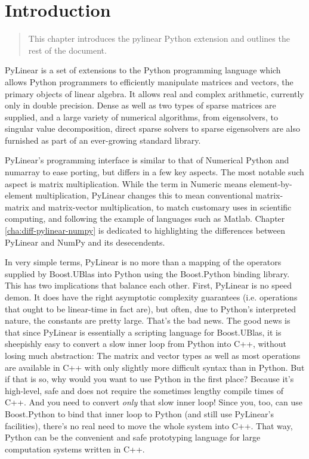 \chapter{Introduction}
\label{cha:introduction}

\begin{quote}
   This chapter introduces the pylinear Python extension and outlines the rest
   of the document.
\end{quote}

PyLinear is a set of extensions to the Python programming language
which allows Python programmers to efficiently manipulate matrices and
vectors, the primary objects of linear algebra.  It allows real and
complex arithmetic, currently only in double precision.  Dense as well
as two types of sparse matrices are supplied, and a large variety of
numerical algorithms, from eigensolvers, to singular value
decomposition, direct sparse solvers to sparse eigensolvers are also
furnished as part of an ever-growing standard library.

PyLinear's programming interface is similar to that of Numerical
Python and numarray to ease porting, but differs in a few key
aspects. The most notable such aspect is matrix multiplication. While
the term  in Numeric means element-by-element
multiplication, PyLinear changes this to mean conventional
matrix-matrix and matrix-vector multiplication, to match customary
uses in scientific computing, and following the example of languages
such as Matlab.  Chapter \ref{cha:diff-pylinear-numpy} is dedicated to
highlighting the differences between PyLinear and NumPy and its
desecendents.

In very simple terms, PyLinear is no more than a mapping of the
operators supplied by Boost.UBlas into Python using the Boost.Python
binding library.  This has two implications that balance each
other. First, PyLinear is no speed demon. It does have the right
asymptotic complexity guarantees (i.e. operations that ought to be
linear-time in fact are), but often, due to Python's interpreted
nature, the constants are pretty large. That's the bad news. The good
news is that since PyLinear is essentially a scripting language for
Boost.UBlas, it is sheepishly easy to convert a slow inner loop from
Python into C++, without losing much abstraction: The matrix and
vector types as well as most operations are available in C++ with only
slightly more difficult syntax than in Python. But if that is so, why
would you want to use Python in the first place? Because it's
high-level, safe and does not require the sometimes lengthy compile
times of C++.  And you need to convert \emph{only} that slow inner
loop!  Since you, too, can use Boost.Python to bind that inner loop to
Python (and still use PyLinear's facilities), there's no real need to
move the whole system into C++. That way, Python can be the convenient
and safe prototyping language for large computation systems written in
C++.
